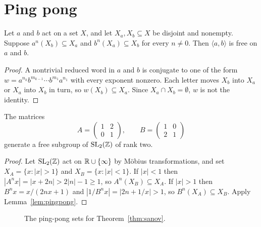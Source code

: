 \section{Ping pong}\label{sec:pingpong}

\begin{lemma}\label{lem:pingpong}
Let $a$ and $b$ act on a set $X$, and let $X_a, X_b \subseteq X$ be disjoint and
nonempty. Suppose $a^n(X_b) \subseteq X_a$ and $b^n(X_a) \subseteq X_b$ for
every $n \neq 0$. Then $\langle a, b \rangle$ is free on $a$ and $b$.
\end{lemma}

\begin{proof}
A nontrivial reduced word in $a$ and $b$ is conjugate to one of the form
$w = a^{n_k} b^{m_{k-1}} \cdots b^{m_1} a^{n_1}$ with every exponent nonzero.
Each letter moves $X_b$ into $X_a$ or $X_a$ into $X_b$ in turn, so
$w(X_b) \subseteq X_a$. Since $X_a \cap X_b = \emptyset$, $w$ is not the
identity.
\end{proof}

\begin{theorem}[Sanov]\label{thm:sanov}
The matrices
\[
  A = \begin{pmatrix} 1 & 2 \\ 0 & 1 \end{pmatrix}, \qquad
  B = \begin{pmatrix} 1 & 0 \\ 2 & 1 \end{pmatrix}
\]
generate a free subgroup of $\mathrm{SL}_2(\mathbb{Z})$ of rank two.
\end{theorem}

\begin{proof}
Let $\mathrm{SL}_2(\mathbb{Z})$ act on $\mathbb{R} \cup \{\infty\}$ by M\"obius transformations, and set
$X_A = \{x : |x| > 1\}$ and $X_B = \{x : |x| < 1\}$. If $|x| < 1$ then
$|A^n x| = |x + 2n| > 2|n| - 1 \geq 1$, so $A^n(X_B) \subseteq X_A$. If
$|x| > 1$ then $B^n x = x/(2nx + 1)$ and $|1/B^n x| = |2n + 1/x| > 1$, so
$B^n(X_A) \subseteq X_B$. Apply Lemma~\ref{lem:pingpong}.
\end{proof}

\begin{figure}[ht]
\centering
{}
\caption{The ping-pong sets for Theorem~\ref{thm:sanov}.}\label{fig:pingpong}
\end{figure}
